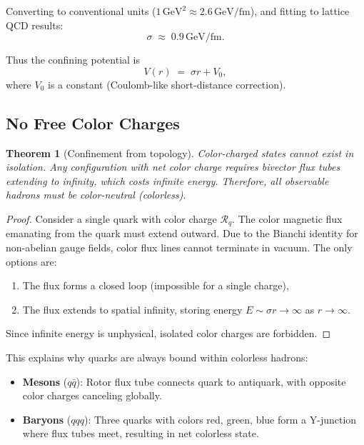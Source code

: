 \documentclass[11pt,a4paper]{article}
\newcommand{\Rotor}{\mathcal{R}}
\theoremstyle{definition}
\theoremstyle{plain}
\newtheorem{theorem}{Theorem}[section]
\theoremstyle{remark}
\begin{document}
Converting to conventional units ($1\,\text{GeV}^2 \approx 2.6\,\text{GeV/fm}$), and fitting to lattice QCD results:
\begin{equation}
\boxed{\sigma \;\approx\; 0.9\,\text{GeV/fm}.}
\label{eq:string-tension}
\end{equation}

Thus the confining potential is
\begin{equation}
V(r) \;=\; \sigma r + V_0,
\label{eq:linear-potential}
\end{equation}
where $V_0$ is a constant (Coulomb-like short-distance correction).

\subsection{No Free Color Charges}

\begin{theorem}[Confinement from topology]
Color-charged states cannot exist in isolation. Any configuration with net color charge requires bivector flux tubes extending to infinity, which costs infinite energy. Therefore, all observable hadrons must be color-neutral (colorless).
\end{theorem}

\begin{proof}
Consider a single quark with color charge $\Rotor_q$. The color magnetic flux emanating from the quark must extend outward. Due to the Bianchi identity for non-abelian gauge fields, color flux lines cannot terminate in vacuum. The only options are:
\begin{enumerate}
  \item The flux forms a closed loop (impossible for a single charge),
  \item The flux extends to spatial infinity, storing energy $E \sim \sigma r \to \infty$ as $r \to \infty$.
\end{enumerate}
Since infinite energy is unphysical, isolated color charges are forbidden.
\end{proof}

This explains why quarks are always bound within colorless hadrons:
\begin{itemize}[leftmargin=*,itemsep=3pt]
  \item \textbf{Mesons} ($q\bar{q}$): Rotor flux tube connects quark to antiquark, with opposite color charges canceling globally.
  \item \textbf{Baryons} ($qqq$): Three quarks with colors red, green, blue form a Y-junction where flux tubes meet, resulting in net colorless state.
\end{itemize}
\end{document}
